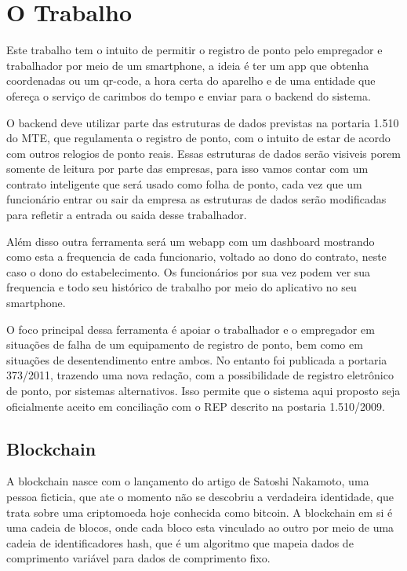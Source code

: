 \documentclass[12pt,openright,twoside,a4paper,english, brazil]{abntex2} %
\begin{document}
\section{O Trabalho}

Este trabalho tem o intuito de permitir o registro de ponto pelo empregador e trabalhador por meio de um smartphone, a ideia é ter um app que obtenha coordenadas ou um qr-code, a hora certa do aparelho e de uma entidade que ofereça o serviço de carimbos do tempo e enviar para o backend do sistema.

O backend deve utilizar parte das estruturas de dados previstas na portaria 1.510 do MTE, que regulamenta o registro de ponto, com o intuito de estar de acordo com outros relogios de ponto reais. Essas estruturas de dados serão visiveis porem somente de leitura por parte das empresas, para isso vamos contar com um contrato inteligente que será usado como folha de ponto, cada vez que um funcionário entrar ou sair da empresa as estruturas de dados serão modificadas para refletir a entrada ou saida desse trabalhador.

Além disso outra ferramenta será um webapp com um dashboard mostrando como esta a frequencia de cada funcionario, voltado ao dono do contrato, neste caso o dono do estabelecimento. Os funcionários por sua vez podem ver sua frequencia e todo seu histórico de trabalho por meio do aplicativo no seu smartphone.

O foco principal dessa ferramenta é apoiar o trabalhador e o empregador em situações de falha de um equipamento de registro de ponto, bem como em situações de desentendimento entre ambos. No entanto foi publicada a portaria 373/2011, trazendo uma nova redação, com a possibilidade de registro eletrônico de ponto, por sistemas alternativos. Isso permite que o sistema aqui proposto seja oficialmente aceito em conciliação com o \gls{REP} descrito na postaria 1.510/2009.


\subsection{Blockchain}

A blockchain nasce com o lançamento do artigo de Satoshi Nakamoto, uma pessoa ficticia, que ate o momento não se descobriu a verdadeira identidade, que trata sobre uma criptomoeda hoje conhecida como bitcoin. A blockchain em si é uma cadeia de blocos, onde cada bloco esta vinculado ao outro por meio de uma cadeia de identificadores hash, que é um algoritmo que mapeia dados de comprimento variável para dados de comprimento fixo. 
\end{document}
